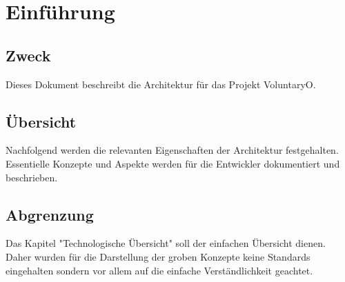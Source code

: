 \chapter{Einführung}
	\section{Zweck}
	Dieses Dokument beschreibt die Architektur für das Projekt VoluntaryO.
	
	\section{Übersicht}
	Nachfolgend werden die relevanten Eigenschaften der Architektur festgehalten. Essentielle Konzepte und Aspekte werden für die Entwickler dokumentiert und beschrieben.

	\section{Abgrenzung}
	Das Kapitel "Technologische Übersicht" soll der einfachen Übersicht dienen. Daher wurden für die Darstellung der groben Konzepte keine Standards eingehalten sondern vor allem auf die einfache Verständlichkeit geachtet.